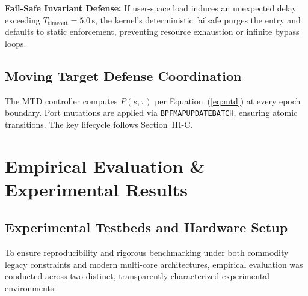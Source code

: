 \documentclass[journal]{IEEEtran}
\renewcommand{\_}{\textunderscore\allowbreak}
\begin{document}
\textbf{Fail-Safe Invariant Defense:}
If user-space load induces an unexpected delay exceeding $T_{\text{timeout}} = 5.0\,\text{s}$, the kernel's deterministic failsafe purges the entry and defaults to static enforcement, preventing resource exhaustion or infinite bypass loops.

\subsection{Moving Target Defense Coordination}
The MTD controller computes $P(s, \tau)$ per Equation~(\ref{eq:mtd}) at every
epoch boundary. Port mutations are applied via \texttt{BPF\_MAP\_UPDATE\_BATCH},
ensuring atomic transitions. The key lifecycle follows Section~III-C.

\section{Empirical Evaluation \& Experimental Results}
\subsection{Experimental Testbeds and Hardware Setup}
To ensure reproducibility and rigorous benchmarking under both commodity legacy constraints and modern multi-core architectures, empirical evaluation was conducted across two distinct, transparently characterized experimental environments:
\end{document}
